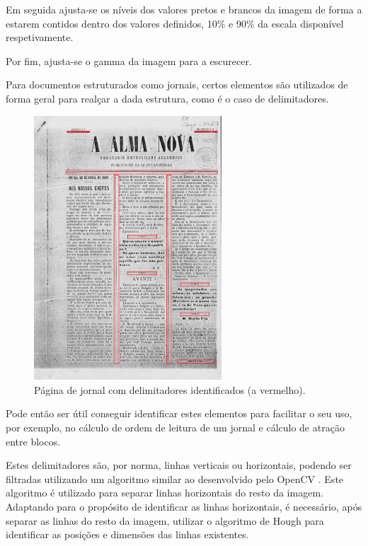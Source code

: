 Em seguida ajusta-se os níveis dos valores pretos e brancos da imagem de forma a estarem contidos dentro dos valores definidos, 10\% e 90\% da escala disponível respetivamente. 

Por fim, ajusta-se o gamma da imagem para a escurecer.


\label{contribution_image_delimiter_identification}

Para documentos estruturados como jornais, certos elementos são utilizados de forma geral para realçar a dada estrutura, como é o caso de delimitadores.


\begin{figure}[H]
	\centering
	\includegraphics[width=7cm]{images/ilustracoes/document_delimiters.png}
	\caption{Página de jornal com delimitadores identificados (a vermelho).}
	\label{fig:document_delimiters_example}
\end{figure}

Pode então ser útil conseguir identificar estes elementos para facilitar o seu uso, por exemplo, no cálculo de ordem de leitura de um jornal e cálculo de atração entre blocos.

Estes delimitadores são, por norma, linhas verticais ou horizontais, podendo ser filtradas utilizando um algoritmo similar ao desenvolvido pelo OpenCV \citep{cv_extract_lines}. Este algoritmo é utilizado para separar linhas horizontais do resto da imagem. Adaptando para o propósito de identificar as linhas horizontais, é necessário, após separar as linhas do resto da imagem, utilizar o algoritmo de Hough para identificar as posições e dimensões das linhas existentes.

